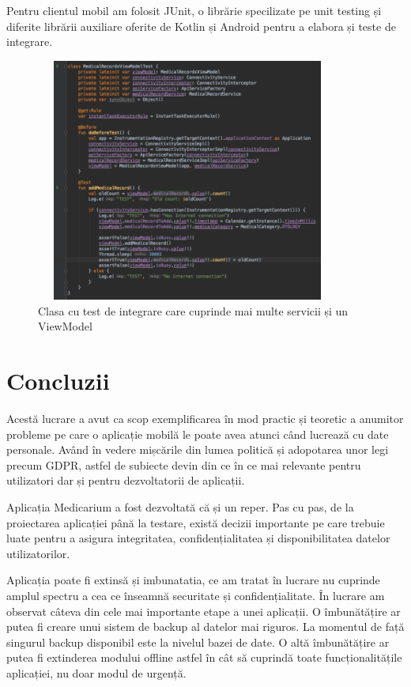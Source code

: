 \documentclass[12pt]{article}
\begin{document}
Pentru clientul mobil am folosit JUnit, o librărie specilizate pe unit testing și
diferite librării auxiliare oferite de Kotlin și Android pentru a elabora și teste de integrare.

\begin{figure}[H]
    \centering
    \includegraphics[width=10cm, height=8cm]{interg.png}
    \caption{Clasa cu test de integrare care cuprinde mai multe servicii și un ViewModel}
    \end{figure}


\newpage
\section{Concluzii}

Acestă lucrare a avut ca scop exemplificarea în mod practic și teoretic a anumitor probleme
pe care o aplicație mobilă le poate avea atunci când lucrează cu date personale.
Având în vedere mișcările din lumea politică și adopotarea unor legi precum GDPR, 
astfel de subiecte devin din ce în ce mai relevante pentru utilizatori dar și pentru
dezvoltatorii de aplicații. 

\bigskip

Aplicația Medicarium a fost dezvoltată că și un reper. Pas cu pas, de la proiectarea
aplicației până la testare, există decizii importante pe care trebuie luate pentru a asigura
integritatea, confidențialitatea și disponibilitatea datelor utilizatorilor.

\bigskip
Aplicația poate fi extinsă și imbunatatia, ce am tratat în lucrare nu cuprinde
amplul spectru a cea ce înseamnă securitate și confidențialitate. În lucrare am
observat câteva din cele mai importante etape a unei aplicații. O îmbunătățire
ar putea fi creare unui sistem de backup al datelor mai riguros. La momentul de față
singurul backup disponibil este la nivelul bazei de date. O altă îmbunătățire
ar putea fi extinderea modului offline astfel în cât să cuprindă toate funcționalitățile
aplicației, nu doar modul de urgență.
\end{document}
